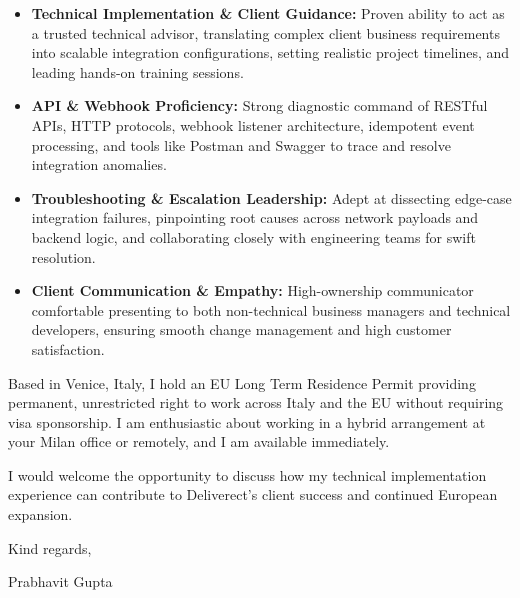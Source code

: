 \documentclass[11pt,a4paper]{article}
\begin{document}
\begin{itemize}[leftmargin=*]
    \item \textbf{Technical Implementation \& Client Guidance:} Proven ability to act as a trusted technical advisor, translating complex client business requirements into scalable integration configurations, setting realistic project timelines, and leading hands-on training sessions.
    \item \textbf{API \& Webhook Proficiency:} Strong diagnostic command of RESTful APIs, HTTP protocols, webhook listener architecture, idempotent event processing, and tools like Postman and Swagger to trace and resolve integration anomalies.
    \item \textbf{Troubleshooting \& Escalation Leadership:} Adept at dissecting edge-case integration failures, pinpointing root causes across network payloads and backend logic, and collaborating closely with engineering teams for swift resolution.
    \item \textbf{Client Communication \& Empathy:} High-ownership communicator comfortable presenting to both non-technical business managers and technical developers, ensuring smooth change management and high customer satisfaction.
\end{itemize}

\noindent Based in Venice, Italy, I hold an EU Long Term Residence Permit providing permanent, unrestricted right to work across Italy and the EU without requiring visa sponsorship. I am enthusiastic about working in a hybrid arrangement at your Milan office or remotely, and I am available immediately.

\noindent I would welcome the opportunity to discuss how my technical implementation experience can contribute to Deliverect's client success and continued European expansion.

\vspace{8pt}

\noindent Kind regards,

\vspace{8pt}

\noindent Prabhavit Gupta
\end{document}
